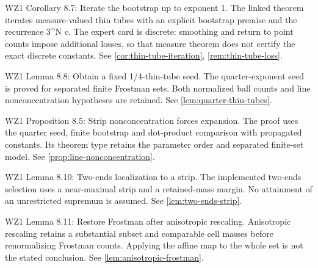 \begin{remark}
\label{rem:atlas-C8_7}
WZ1 Corollary 8.7: Iterate the bootstrap up to exponent 1.
The linked theorem iterates measure-valued thin tubes with an explicit bootstrap premise and the recurrence 3\textasciicircum{}N c. The expert card is discrete: smoothing and return to point counts impose additional losses, so that measure theorem does not certify the exact discrete constants.
See \ref{cor:thin-tube-iteration}, \ref{rem:thin-tube-loss}.
\end{remark}

\begin{remark}
\label{rem:atlas-L8_8}
WZ1 Lemma 8.8: Obtain a fixed 1/4-thin-tube seed.
The quarter-exponent seed is proved for separated finite Frostman sets. Both normalized ball counts and line nonconcentration hypotheses are retained.
See \ref{lem:quarter-thin-tubes}.
\end{remark}

\begin{remark}
\label{rem:atlas-P8_5}
WZ1 Proposition 8.5: Strip nonconcentration forces expansion.
The proof uses the quarter seed, finite bootstrap and dot-product comparison with propagated constants. Its theorem type retains the parameter order and separated finite-set model.
See \ref{prop:line-nonconcentration}.
\end{remark}

\begin{remark}
\label{rem:atlas-L8_10}
WZ1 Lemma 8.10: Two-ends localization to a strip.
The implemented two-ends selection uses a near-maximal strip and a retained-mass margin. No attainment of an unrestricted supremum is assumed.
See \ref{lem:two-ends-strip}.
\end{remark}

\begin{remark}
\label{rem:atlas-L8_11}
WZ1 Lemma 8.11: Restore Frostman after anisotropic rescaling.
Anisotropic rescaling retains a substantial subset and comparable cell masses before renormalizing Frostman counts. Applying the affine map to the whole set is not the stated conclusion.
See \ref{lem:anisotropic-frostman}.
\end{remark}

